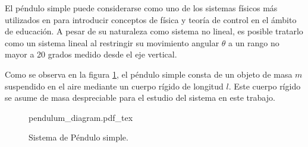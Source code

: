
El péndulo simple puede considerarse como uno de los sistemas 
físicos más utilizados en  para introducir conceptos de física 
y teoría de control en el ámbito de educación. 
A pesar de su naturaleza como sistema no lineal, es posible tratarlo como
un sistema lineal al restringir su movimiento angular $\theta$ a un rango
no mayor a 20 grados medido desde el eje vertical.

Como se observa en la figura \ref{fig: simple pendulum}, 
el péndulo simple consta de un objeto de masa $m$ suspendido 
en el aire mediante un cuerpo rígido de longitud $l$. 
Este cuerpo rígido se asume de masa despreciable para el estudio 
del sistema en este trabajo.

 \begin{figure}[ht]
    \centering
    {pendulum_diagram.pdf_tex}
    \caption{Sistema de Péndulo simple.}
    \label{fig: simple pendulum}
\end{figure}

